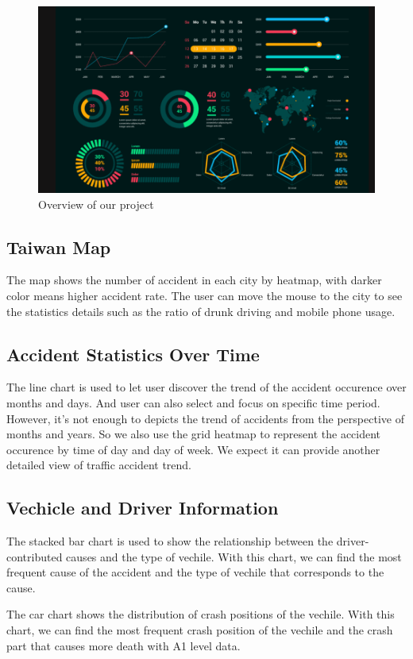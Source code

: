 \documentclass[a4paper, oneside, final, 12pt]{scrartcl} %
\begin{document}
\begin{figure}[t]
  \centering
  \includegraphics[width=\textwidth]{Image/overview_sample.png}
  \caption{Overview of our project}
  \label{fig:overview}
\end{figure}

\subsection{Taiwan Map}

The map shows the number of accident in each city
by heatmap, with darker color means higher accident rate.
The user can move the mouse to the city to see the statistics details
such as the ratio of drunk driving and mobile phone usage.

\subsection{Accident Statistics Over Time}

The line chart is used to let user discover the trend of the accident occurence
over months and days. And user can also select and focus on specific time period.
However, it's not enough to depicts the trend of accidents 
from the perspective of months and years.
So we also use the grid heatmap to represent 
the accident occurence by time of day and day of week.
We expect it can provide another detailed view of traffic accident trend.

\subsection{Vechicle and Driver Information}

The stacked bar chart is used to show the relationship between the driver-contributed causes
and the type of vechile. With this chart, we can find the most frequent cause of the accident
and the type of vechile that corresponds to the cause.

The car chart shows the distribution of crash positions of the vechile.
With this chart, we can find the most frequent crash position of the vechile
and the crash part that causes more death with A1 level data.

\endgroup

\end{document}

